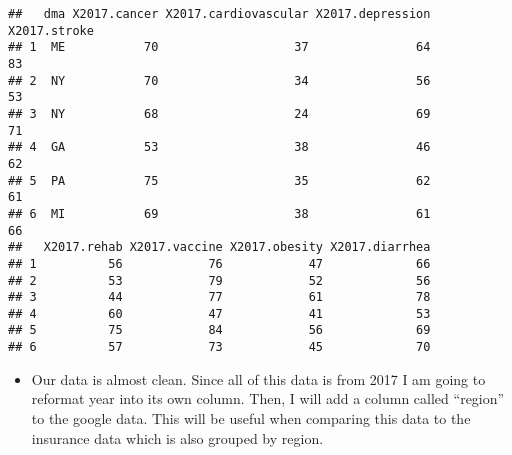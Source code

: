 \documentclass[]{article}
\newenvironment{Shaded}{\begin{snugshade}}{\end{snugshade}}
\newcommand{\CharTok}[1]{\textcolor[rgb]{0.31,0.60,0.02}{#1}}
\newcommand{\DataTypeTok}[1]{\textcolor[rgb]{0.13,0.29,0.53}{#1}}
\newcommand{\DecValTok}[1]{\textcolor[rgb]{0.00,0.00,0.81}{#1}}
\newcommand{\KeywordTok}[1]{\textcolor[rgb]{0.13,0.29,0.53}{\textbf{#1}}}
\newcommand{\NormalTok}[1]{#1}
\newcommand{\OperatorTok}[1]{\textcolor[rgb]{0.81,0.36,0.00}{\textbf{#1}}}
\newcommand{\StringTok}[1]{\textcolor[rgb]{0.31,0.60,0.02}{#1}}
\providecommand{\tightlist}{%
  \setlength{\itemsep}{0pt}\setlength{\parskip}{0pt}}
\begin{document}
\begin{Shaded}
\end{Shaded}

\begin{verbatim}
##   dma X2017.cancer X2017.cardiovascular X2017.depression X2017.stroke
## 1  ME           70                   37               64           83
## 2  NY           70                   34               56           53
## 3  NY           68                   24               69           71
## 4  GA           53                   38               46           62
## 5  PA           75                   35               62           61
## 6  MI           69                   38               61           66
##   X2017.rehab X2017.vaccine X2017.obesity X2017.diarrhea
## 1          56            76            47             66
## 2          53            79            52             56
## 3          44            77            61             78
## 4          60            47            41             53
## 5          75            84            56             69
## 6          57            73            45             70
\end{verbatim}

\begin{itemize}
\tightlist
\item
  Our data is almost clean. Since all of this data is from 2017 I am
  going to reformat year into its own column. Then, I will add a column
  called ``region'' to the google data. This will be useful when
  comparing this data to the insurance data which is also grouped by
  region.
\end{itemize}
\end{document}
